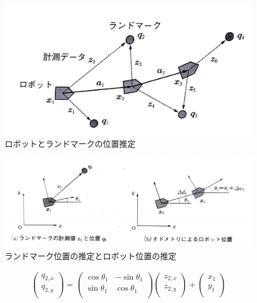 \begin{figure}[h]
  \begin{center}
  \includegraphics[width=\linewidth]{img/slam_6.pdf}
  \caption{ロボットとランドマークの位置推定}
  \label{slam:chizu2}
  \end{center}
\end{figure}

\begin{figure}[h]
  \begin{center}
  \includegraphics[width=\columnwidth]{img/slam_7.pdf}
  \caption{ランドマーク位置の推定とロボット位置の推定}
  \label{slam:suitei}
  \end{center}
\end{figure}

\clearpage

\begin{align}
  \begin{pmatrix}
    q_{2,x}\\
    q_{2,y}\\
  \end{pmatrix}
  =
  \begin{pmatrix}
    \cos\theta_1&-\sin\theta_1\\
    \sin\theta_1&\cos\theta_1\\
  \end{pmatrix}
  \begin{pmatrix}
    z_{2,x}\\
    z_{2,y}\\
  \end{pmatrix}
  +
  \begin{pmatrix}
    x_1\\
    y_1\\
  \end{pmatrix} \label{slam:eq:q2}
\end{align}

